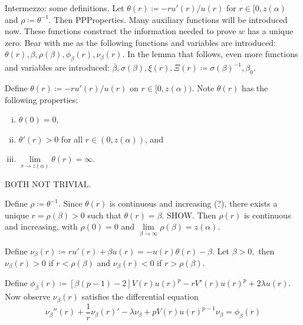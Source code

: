 {\color{gray} Intermezzo: some definitions. Let $\theta(r)\coloneqq-ru'(r)/u(r)$ for $r\in[0,z(\alpha)$ and $\rho\coloneqq\theta^{-1}$. Then PPProperties. Many auxiliary functions will be introduced now. These functions construct the information needed to prove $w$ has a unique zero. Bear with me as the following functions and variables are introduced: $\theta(r),\beta,\rho(\beta),\phi_{\beta}(r),\nu_{\beta}(r)$. In the lemma that follows, even more functions and variables are introduced: $\bar\beta,\sigma(\beta),\xi(r), \Xi(r)\coloneqq\sigma(\beta)^{-1},\beta_0$.}

{\color{teal}Define $\theta(r)\coloneqq-ru'(r)/u(r)$ on $r\in[0,z(\alpha))$. Note $\theta(r)$ has the following properties: \begin{enumerate}[(i)]\item $\theta(0)=0$, \item $\theta'(r)>0$ for all $r\in(0,z(\alpha))$, and \item $\underset{r\to z(\alpha)}{\lim}\theta(r)=\infty$. \end{enumerate} BOTH NOT TRIVIAL.

Define $\rho\coloneqq\theta^{-1}$. Since $\theta(r)$ is continuous and increasing (?), there exists a unique $r=\rho(\beta)>0$ such that $\theta(r)=\beta$. SHOW. Then $\rho(r)$ is continuous and increasing, with $\rho(0)=0$ and $\underset{\beta\to\infty}{\lim}\rho(\beta)=z(\alpha).$

Define $\nu_{\beta}(r)\coloneqq ru'(r)+\beta u(r)=-u(r){\theta(r)-\beta}.$ Let $\beta>0,$ then $\nu_{\beta}(r)>0$ if $r<\rho(\beta)$ and $\nu_{\beta}(r)<0$ if $r>\rho(\beta)$.

Define $\phi_{\beta}(r)\coloneqq\left[\beta(p-1)-2\right]V(r)u(r)^p-rV'(r)u(r)^p+2\lambda u(r).$ Now observe $\nu_{\beta}(r)$ satisfies the differential equation $$\nu_{\beta}''(r)+\frac{1}{r}\nu_{\beta}(r)'-\lambda\nu_{\beta}+pV(r)u(r)^{p-1}\nu_{\beta}=\phi_{\beta}(r)$$}